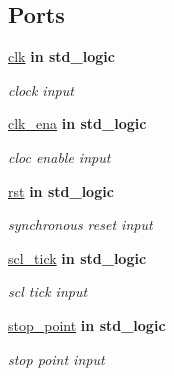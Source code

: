 \subsection*{Ports}
 \begin{DoxyCompactItemize}
\item 
\hyperlink{classrestart__generator_a4a4609c199d30b3adebbeb3a01276ec5}{clk}  {\bfseries {\bfseries \textcolor{vhdlchar}{in}\textcolor{vhdlchar}{ }}} {\bfseries \textcolor{vhdlchar}{std\+\_\+logic}\textcolor{vhdlchar}{ }} 
\begin{DoxyCompactList}\small\item\em clock input \end{DoxyCompactList}\item 
\hyperlink{classrestart__generator_a373faa4fdd1aebdfb0b95d5d53da4434}{clk\+\_\+ena}  {\bfseries {\bfseries \textcolor{vhdlchar}{in}\textcolor{vhdlchar}{ }}} {\bfseries \textcolor{vhdlchar}{std\+\_\+logic}\textcolor{vhdlchar}{ }} 
\begin{DoxyCompactList}\small\item\em cloc enable input \end{DoxyCompactList}\item 
\hyperlink{classrestart__generator_ae0366c76519a377d49a533f4eff582ad}{rst}  {\bfseries {\bfseries \textcolor{vhdlchar}{in}\textcolor{vhdlchar}{ }}} {\bfseries \textcolor{vhdlchar}{std\+\_\+logic}\textcolor{vhdlchar}{ }} 
\begin{DoxyCompactList}\small\item\em synchronous reset input \end{DoxyCompactList}\item 
\hyperlink{classrestart__generator_ad9d06ff2f81f48b03857f1a38ce130d6}{scl\+\_\+tick}  {\bfseries {\bfseries \textcolor{vhdlchar}{in}\textcolor{vhdlchar}{ }}} {\bfseries \textcolor{vhdlchar}{std\+\_\+logic}\textcolor{vhdlchar}{ }} 
\begin{DoxyCompactList}\small\item\em scl tick input \end{DoxyCompactList}\item 
\hyperlink{classrestart__generator_ae5b5aaf8947a9de595b67e0f57b9e9a3}{stop\+\_\+point}  {\bfseries {\bfseries \textcolor{vhdlchar}{in}\textcolor{vhdlchar}{ }}} {\bfseries \textcolor{vhdlchar}{std\+\_\+logic}\textcolor{vhdlchar}{ }} 
\begin{DoxyCompactList}\small\item\em stop point input \end{DoxyCompactList}\item 

\end{DoxyCompactItemize}
